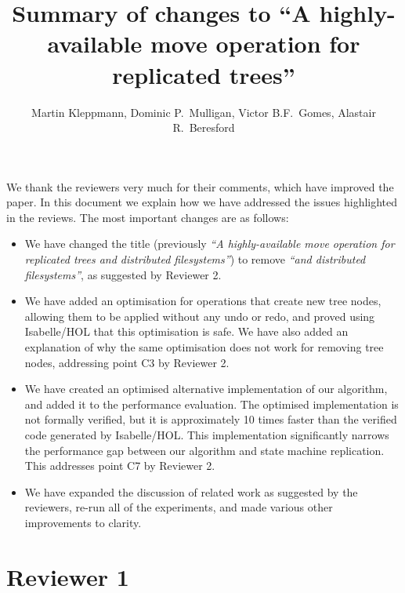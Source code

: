 \documentclass[10pt]{article}
\begin{document}
\title{Summary of changes to ``A highly-available move operation for replicated trees''}
\author{Martin Kleppmann, Dominic P.\ Mulligan, Victor B.F.\ Gomes, Alastair R.\ Beresford}
\date{}
\maketitle

We thank the reviewers very much for their comments, which have improved the paper.
In this document we explain how we have addressed the issues highlighted in the reviews.
The most important changes are as follows:
\begin{itemize}
\item We have changed the title (previously \emph{``A highly-available move operation for replicated trees and distributed filesystems''}) to remove \emph{``and distributed filesystems''}, as suggested by Reviewer 2.
\item We have added an optimisation for operations that create new tree nodes, allowing them to be applied without any undo or redo, and proved using Isabelle/HOL that this optimisation is safe.
We have also added an explanation of why the same optimisation does not work for removing tree nodes, addressing point C3 by Reviewer 2.
\item We have created an optimised alternative implementation of our algorithm, and added it to the performance evaluation.
The optimised implementation is not formally verified, but it is approximately 10 times faster than the verified code generated by Isabelle/HOL.
This implementation significantly narrows the performance gap between our algorithm and state machine replication.
This addresses point C7 by Reviewer 2.
\item We have expanded the discussion of related work as suggested by the reviewers, re-run all of the experiments, and made various other improvements to clarity.
\end{itemize}

\section{Reviewer 1}
\end{document}
